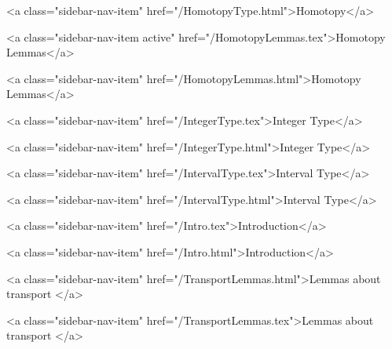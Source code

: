       
    
      
        
          <a class="sidebar-nav-item" href="/HomotopyType.html">Homotopy</a>
        
      
    
      
        
          <a class="sidebar-nav-item active" href="/HomotopyLemmas.tex">Homotopy Lemmas</a>
        
      
    
      
        
          <a class="sidebar-nav-item" href="/HomotopyLemmas.html">Homotopy Lemmas</a>
        
      
    
      
        
          <a class="sidebar-nav-item" href="/IntegerType.tex">Integer Type</a>
        
      
    
      
        
          <a class="sidebar-nav-item" href="/IntegerType.html">Integer Type</a>
        
      
    
      
        
          <a class="sidebar-nav-item" href="/IntervalType.tex">Interval Type</a>
        
      
    
      
        
          <a class="sidebar-nav-item" href="/IntervalType.html">Interval Type</a>
        
      
    
      
        
          <a class="sidebar-nav-item" href="/Intro.tex">Introduction</a>
        
      
    
      
        
          <a class="sidebar-nav-item" href="/Intro.html">Introduction</a>
        
      
    
      
        
          <a class="sidebar-nav-item" href="/TransportLemmas.html">Lemmas about transport </a>
        
      
    
      
        
          <a class="sidebar-nav-item" href="/TransportLemmas.tex">Lemmas about transport </a>
        
